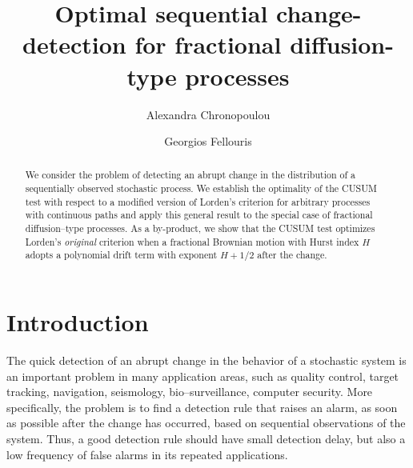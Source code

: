\documentclass[11pt,reqno]{amsart}
\theoremstyle{remark}
\begin{document}
\title[Optimal sequential change-detection]{Optimal sequential change-detection for fractional diffusion-type processes}
\author{Alexandra Chronopoulou}
\address{Alexandra Chronopoulou \\  Department of Statistics and Applied Probability\\ University of California, Santa Barbara \\ CA
93106, USA}

\author{Georgios Fellouris}
\address{Georgios Fellouris \\  Department of Mathematics\\ University of Southern California\\ 
Los Angeles, CA 90089, USA}

\begin{abstract}
We consider the problem of  detecting an abrupt change in the distribution of a sequentially observed stochastic process. 
We establish the optimality of the CUSUM  test with respect to a modified version of Lorden's criterion for arbitrary processes with continuous paths
and apply this general result to the special case of fractional diffusion--type processes.
As a by-product, we show that the CUSUM test optimizes Lorden's \textit{original} criterion  when a fractional Brownian motion with Hurst index $H$ 
adopts a polynomial drift term with exponent  $H+1/2$ after the change. 
\end{abstract}



\maketitle

\section{Introduction}
The quick  detection of an abrupt change in the behavior of a stochastic system is an important problem in many application areas, such as quality control,  target tracking, navigation,  seismology, bio--surveillance, computer security. 
More specifically, the problem is to find a detection rule that raises an alarm, as soon as possible after the change has occurred, based on sequential observations of the system. Thus, a good detection rule should have small detection delay, but also a low frequency of false alarms in its repeated applications. 
\end{document}
